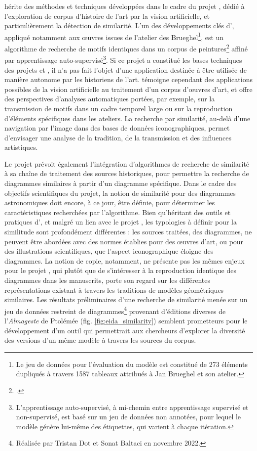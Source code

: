 \vhs hérite des méthodes et techniques développées dans le cadre du projet \enherit, dédié à l'exploration de corpus d'histoire de l'art par la vision artificielle, et particulièrement la détection de similarité. L'un des développements clés d'\enherit, appliqué notamment aux œuvres issues de l'atelier des Brueghel\footnote{Le jeu de données pour l'évaluation du modèle est constitué de 273 éléments dupliqués à travers 1587 tableaux attribués à Jan Brueghel et son atelier.}, est un algorithme de recherche de motifs identiques dans un corpus de peintures\footcite{shenDiscoveringVisualPatterns2019} affiné par apprentissage auto-supervisé\footnote{L'apprentissage auto-supervisé, à mi-chemin entre apprentissage supervisé et non-supervisé, est basé sur un jeu de données non annotées, pour lequel le modèle génère lui-même des étiquettes, qui varient à chaque itération.}. Si ce projet a constitué les bases techniques des projets \eida et \vhs, il n'a pas fait l'objet d'une application destinée à être utilisée de manière autonome par les historiens de l'art. \enherit témoigne cependant des applications possibles de la vision artificielle au traitement d'un corpus d'œuvres d'art, et offre des perspectives d'analyses automatiques portées, par exemple, sur la transmission de motifs dans un cadre temporel large ou sur la reproduction d'éléments spécifiques dans les ateliers. La recherche par similarité, au-delà d'une navigation par l'image dans des bases de données iconographiques, permet d'envisager une analyse de la tradition, de la transmission et des influences artistiques.

Le projet \eida prévoit également l'intégration d'algorithmes de recherche de similarité à sa chaîne de traitement des sources historiques, pour permettre la recherche de diagrammes similaires à partir d'un diagramme spécifique. Dans le cadre des objectifs scientifiques du projet, la notion de similarité pour des diagrammes astronomiques doit encore, à ce jour, être définie, pour déterminer les caractéristiques recherchées par l'algorithme. Bien qu'héritant des outils et pratiques d'\enherit, et malgré un lien avec le projet \vhs, les typologies à définir pour la similitude sont profondément différentes : les sources traitées, des diagrammes, ne peuvent être abordées avec des normes établies pour des œuvres d'art, ou pour des illustrations scientifiques, que l'aspect iconographique éloigne des diagrammes. La notion de copie, notamment, ne présente pas les mêmes enjeux pour le projet \eida, qui plutôt que de s'intéresser à la reproduction identique des diagrammes dans les manuscrits, porte son regard sur les différentes représentations existant à travers les traditions de modèles géométriques similaires. Les résultats préliminaires d'une recherche de similarité menée sur un jeu de données restreint de diagrammes\footnote{Réalisée par Tristan Dot et Sonat Baltaci en novembre 2022.} provenant d'éditions diverses de l'\textit{Almageste} de Ptolémée (fig. \ref{fig:eida_similarity}) semblent prometteurs pour le développement d'un outil qui permettrait aux chercheurs d'explorer la diversité des versions d'un même modèle à travers les sources du corpus.

